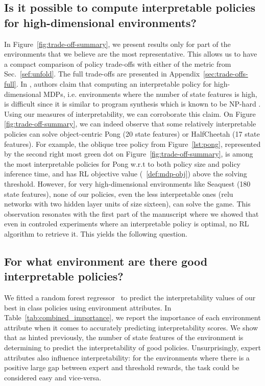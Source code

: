 \subsection{Is it possible to compute interpretable policies for high-dimensional environments?}
In Figure~\ref{fig:trade-off-summary}, we present results only for part of the environments that we believe are the most representative.
This allows us to have a compact comparison of policy trade-offs with either of the metric from Sec.~\ref{sef:unfold}.
The full trade-offs are presented in Appendix~\ref{sec:trade-offs-full}.
In \cite{glanois-survey}, authors claim that computing an interpretable policy for high-dimensional MDPs, i.e. environments where the number of state features is high, is difficult since it is similar to program synthesis which is known to be NP-hard \cite{program-synth}.
Using our measures of interpretability, we can corroborate this claim.
On Figure \ref{fig:trade-off-summary}, we can indeed observe that some relatively interpretable policies can solve object-centric Pong (20 state features) or HalfCheetah (17 state features). 
For example, the oblique tree policy from Figure~\ref{lst:pong}, represented by the second right most green dot on Figure~\ref{fig:trade-off-summary}, is among the most interpretable policies for Pong w.r.t to both policy size and policy inference time, and has RL objective value (~\ref{def:mdp-obj}) above the solving threshold.  
However, for very high-dimensional environments like Seaquest (180 state features), none of our policies, even the less interpretable ones (relu networks with two hidden layer units of size sixteen), can solve the game.
This observation resonates with the first part of the manuscript where we showed that even in controled experiments where an interpretable policy is optimal, no RL algorithm to retrieve it.
This yields the following question.

\subsection{For what environment are there good interpretable policies?}
We fitted a random forest regressor~\cite{random} to predict the interpretability values of our best in class policies using environment attributes. 
In Table~\ref{tab:combined_importance}, we report the importance of each environment attribute when it comes to accurately predicting interpretability scores.
We show that as hinted previously, the number of state features of the environment is determining to predict the interpretability of good policies.
Unsurprisingly, expert attributes also influence interpretability: for the environments where there is a positive large gap between expert and threshold rewards, the task could be considered easy and vice-versa.

